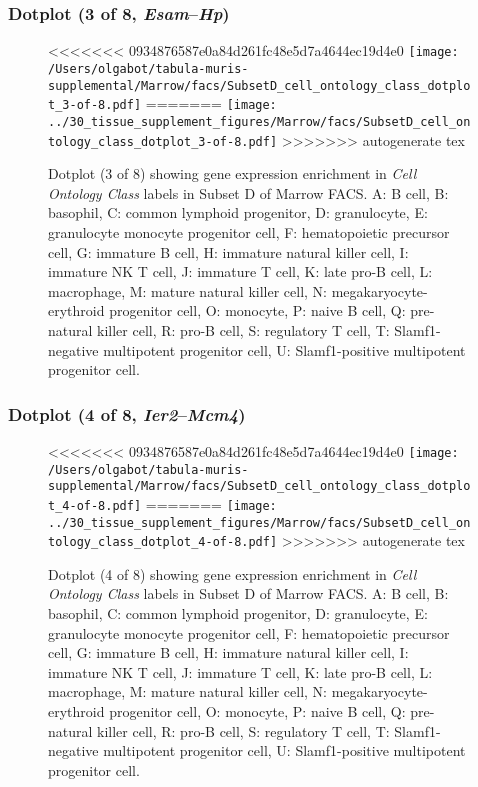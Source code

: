 \clearpage

\subsubsection{Dotplot (3 of 8, \emph{Esam}--\emph{Hp})}
\begin{figure}[h]
\centering
<<<<<<< 0934876587e0a84d261fc48e5d7a4644ec19d4e0
\texttt{[image: /Users/olgabot/tabula-muris-supplemental/Marrow/facs/SubsetD\_cell\_ontology\_class\_dotplot\_3-of-8.pdf]}
=======
\texttt{[image: ../30\_tissue\_supplement\_figures/Marrow/facs/SubsetD\_cell\_ontology\_class\_dotplot\_3-of-8.pdf]}
>>>>>>> autogenerate tex

\caption{ Dotplot (3 of 8)  showing gene expression enrichment in \emph{Cell Ontology Class} labels in Subset D of Marrow FACS. A: B cell, B: basophil, C: common lymphoid progenitor, D: granulocyte, E: granulocyte monocyte progenitor cell, F: hematopoietic precursor cell, G: immature B cell, H: immature natural killer cell, I: immature NK T cell, J: immature T cell, K: late pro-B cell, L: macrophage, M: mature natural killer cell, N: megakaryocyte-erythroid progenitor cell, O: monocyte, P: naive B cell, Q: pre-natural killer cell, R: pro-B cell, S: regulatory T cell, T: Slamf1-negative multipotent progenitor cell, U: Slamf1-positive multipotent progenitor cell.}
\end{figure}


\clearpage

\subsubsection{Dotplot (4 of 8, \emph{Ier2}--\emph{Mcm4})}
\begin{figure}[h]
\centering
<<<<<<< 0934876587e0a84d261fc48e5d7a4644ec19d4e0
\texttt{[image: /Users/olgabot/tabula-muris-supplemental/Marrow/facs/SubsetD\_cell\_ontology\_class\_dotplot\_4-of-8.pdf]}
=======
\texttt{[image: ../30\_tissue\_supplement\_figures/Marrow/facs/SubsetD\_cell\_ontology\_class\_dotplot\_4-of-8.pdf]}
>>>>>>> autogenerate tex

\caption{ Dotplot (4 of 8)  showing gene expression enrichment in \emph{Cell Ontology Class} labels in Subset D of Marrow FACS. A: B cell, B: basophil, C: common lymphoid progenitor, D: granulocyte, E: granulocyte monocyte progenitor cell, F: hematopoietic precursor cell, G: immature B cell, H: immature natural killer cell, I: immature NK T cell, J: immature T cell, K: late pro-B cell, L: macrophage, M: mature natural killer cell, N: megakaryocyte-erythroid progenitor cell, O: monocyte, P: naive B cell, Q: pre-natural killer cell, R: pro-B cell, S: regulatory T cell, T: Slamf1-negative multipotent progenitor cell, U: Slamf1-positive multipotent progenitor cell.}
\end{figure}


